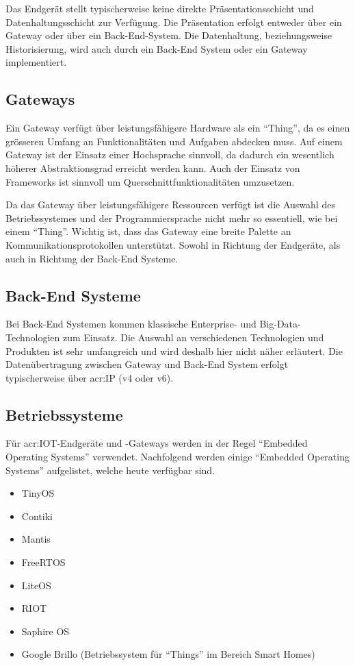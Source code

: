 Das Endgerät stellt typischerweise keine direkte Präsentationsschicht und Datenhaltungsschicht zur Verfügung. Die Präsentation erfolgt entweder über ein Gateway oder über ein Back-End-System. Die Datenhaltung, beziehungsweise Historisierung, wird auch durch ein Back-End System oder ein Gateway implementiert. 


\subsection{Gateways}
Ein Gateway verfügt über leistungsfähigere Hardware als ein "`Thing"', da es einen grösseren Umfang an Funktionalitäten und Aufgaben abdecken muss. Auf einem Gateway ist der Einsatz einer Hochsprache sinnvoll, da dadurch ein wesentlich höherer Abstraktionsgrad erreicht werden kann. Auch der Einsatz von Frameworks ist sinnvoll um Querschnittfunktionalitäten umzusetzen.

Da das Gateway über leistungsfähigere Ressourcen verfügt ist die Auswahl des Betriebssystemes und der Programmiersprache nicht mehr so essentiell, wie bei einem "`Thing"'. Wichtig ist, dass das Gateway eine breite Palette an Kommunikationsprotokollen unterstützt. Sowohl in Richtung der Endgeräte, als auch in Richtung der Back-End Systeme.


\subsection{Back-End Systeme}
Bei Back-End Systemen kommen klassische Enterprise- und Big-Data-Technologien zum Einsatz. Die Auswahl an verschiedenen Technologien und Produkten ist sehr umfangreich und wird deshalb hier nicht näher erläutert. Die Datenübertragung zwischen Gateway und Back-End System erfolgt typischerweise über \gls{acr:IP} (v4 oder v6).



\subsection{Betriebssysteme}
Für \gls{acr:IOT}-Endgeräte und -Gateways werden in der Regel "`Embedded Operating Systems"' verwendet. Nachfolgend werden einige "`Embedded Operating Systems"' aufgelistet, welche heute verfügbar sind.

\begin{itemize}
\item TinyOS
\item Contiki
\item Mantis
\item FreeRTOS
\item LiteOS
\item RIOT
\item Saphire OS
\item Google Brillo (Betriebssystem für "`Things"' im Bereich Smart Homes)
\end{itemize}



